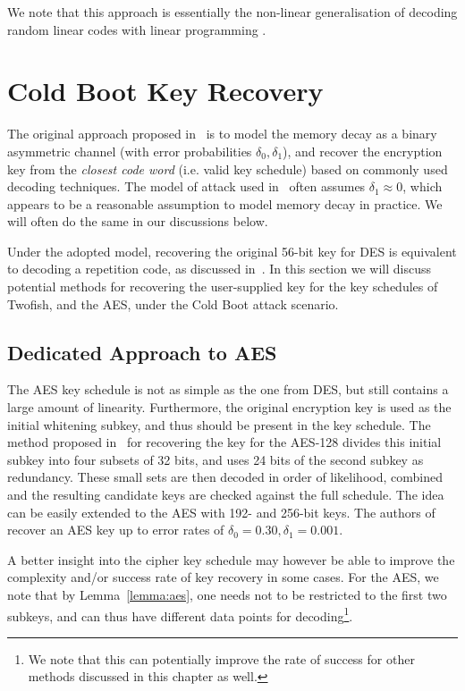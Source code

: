 We note that this approach is essentially the non-linear generalisation of decoding random linear codes with linear programming \cite{feldman:phd}.


\section{Cold Boot Key Recovery}
\label{sec:keyrecovery}

The original approach proposed in~\cite{coldboot08} is to model the memory decay as a binary asymmetric channel (with error probabilities $\delta_0, \delta_1$), 
and recover the encryption key from the \emph{closest code word} (i.e. valid key schedule) based
on commonly used decoding techniques. The model of attack used in~\cite{coldboot08} often assumes $\delta_1 \approx 0$, which appears to be a reasonable 
assumption to model memory decay in practice. We will often do the same in our discussions below.

Under the adopted model, recovering the original 56-bit key for DES is equivalent to decoding a repetition code, as discussed in~\cite{coldboot08}. 
In this section we will discuss potential methods for recovering the user-supplied key for the key schedules of Twofish, \Serpent and the AES, under the Cold Boot attack scenario.

\subsection{Dedicated Approach to AES}

The AES key schedule is not as simple as the one from DES, but still contains a large amount of linearity. Furthermore, the original encryption key is used as the initial whitening subkey, and thus should be present in the key schedule. 
The method proposed in~\cite{coldboot08} for recovering the key for the AES-128 divides this initial subkey into four subsets of 32 bits, and uses 24 bits of the second subkey as redundancy. These small sets are then decoded in order of likelihood, combined and the resulting candidate keys are checked against the full schedule. The idea can be easily extended to the AES with 192- and 256-bit keys. 
The authors of~\cite{coldboot08} recover an AES key up to error rates of $\delta_0 = 0.30,\delta_1=0.001$.

A better insight into the cipher key schedule may however be able to improve the complexity and/or success rate of key recovery in some cases. For the AES, we note that by Lemma~\ref{lemma:aes}, one needs not to be restricted
to the first two subkeys, and can thus have different data points for decoding\footnote{We note that this can potentially improve the rate of success for other methods discussed in this chapter as well.}. 

